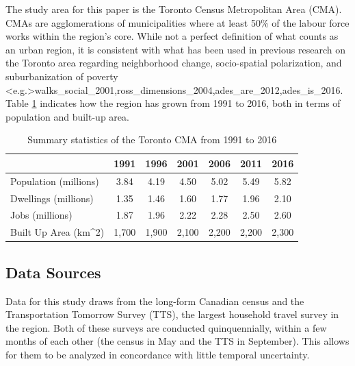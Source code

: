The study area for this paper is the Toronto Census Metropolitan Area (CMA). CMAs are agglomerations of municipalities where at least 50\% of the labour force works within the region's core. While not a perfect definition of what counts as an urban region, it is consistent with what has been used in previous research on the Toronto area regarding neighborhood change, socio-spatial polarization, and suburbanization of poverty \shortcite<e.g.>{walks_social_2001,ross_dimensions_2004,ades_are_2012,ades_is_2016}. 
Table \ref{table:summary} indicates how the region has grown from 1991 to 2016, both in terms of population and built-up area.


\begin{table}[h]
	\small
	
	\caption{{Summary statistics of the Toronto CMA from 1991 to 2016}}
	\label{table:summary}
	\begin{adjustwidth}{-1in}{-1in}
		\centering
	\begin{tabular}{lcccccc}
		\hline
		\textbf{}                          & \textbf{1991} & \textbf{1996} & \textbf{2001} & \textbf{2006} & \textbf{2011} & \textbf{2016} \\
		\hline
		Population (millions)                      & 3.84   & 4.19   & 4.50   & 5.02   & 5.49   & 5.82   \\
		Dwellings (millions)                       & 1.35   & 1.46   & 1.60   & 1.77   & 1.96   & 2.10   \\
		Jobs (millions)                                                    & 1.87    & 1.96    & 2.22   & 2.28    & 2.50     & 2.60  \\
		Built Up Area (km\textasciicircum{}2)      & 1,700  & 1,900  & 2,100  & 2,200  & 2,200  & 2,300  \\
		
		\hline 
	\end{tabular}
\end{adjustwidth}
\end{table}

\subsection{Data Sources}

Data for this study draws from the long-form Canadian census and the Transportation Tomorrow Survey (TTS), the largest household travel survey in the region. Both of these surveys are conducted quinquennially, within a few months of each other (the census in May and the TTS in September). This allows for them to be analyzed in concordance with little temporal uncertainty. 


